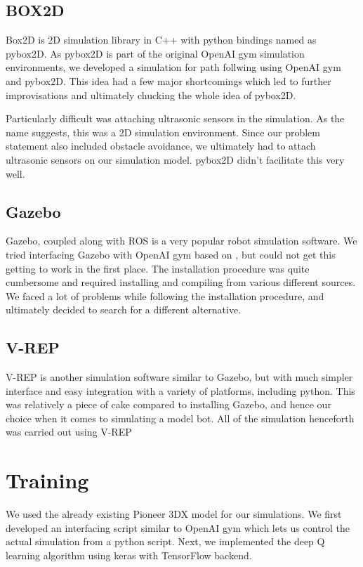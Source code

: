 \documentclass[12pt]{extreport}
\begin{document}
\subsection{BOX2D}
Box2D is 2D simulation library in C++ with python bindings named as pybox2D. As pybox2D is part of the original OpenAI gym simulation environments, we developed a simulation for path follwing using OpenAI gym and pybox2D. This idea had a few major shortcomings which led to further improvisations and ultimately chucking the whole idea of pybox2D.

Particularly difficult was attaching ultrasonic sensors in the simulation. As the name suggests, this was a 2D simulation environment. Since our problem statement also included obstacle avoidance, we ultimately had to attach ultrasonic sensors on our simulation model. pybox2D didn't facilitate this very well.

\subsection{Gazebo}
Gazebo, \cite{gazebo} coupled along with ROS \cite{ros} is a very popular robot simulation software. We tried interfacing Gazebo with OpenAI gym based on \cite{gym-gazebo}, but could not get this getting to work in the first place. The installation procedure was quite cumbersome and required installing and compiling from various different sources. We faced a lot of problems while following the installation procedure, and ultimately decided to search for a different alternative.

\subsection{V-REP}
V-REP \cite{v-rep} is another simulation software similar to Gazebo, but with much simpler interface and easy integration with a variety of platforms, including python. This was relatively a piece of cake compared to installing Gazebo, and hence our choice when it comes to simulating a model bot. All of the simulation henceforth was carried out using V-REP

\section{Training}

We used the already existing Pioneer 3DX model for our simulations. We first developed an interfacing script similar to OpenAI gym which lets us control the actual simulation from a python script. Next, we implemented the deep Q learning algorithm using keras with TensorFlow backend.
\end{document}
